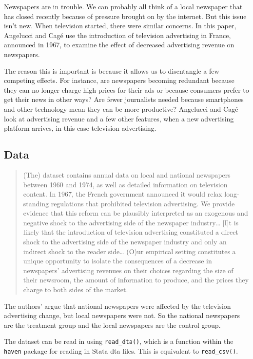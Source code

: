 \documentclass[
]{book}
\begin{document}
Newspapers are in trouble. We can probably all think of a local newspaper that has closed recently because of pressure brought on by the internet. But this issue isn't new. When television started, there were similar concerns. In this paper, Angelucci and Cagé use the introduction of television advertising in France, announced in 1967, to examine the effect of decreased advertising revenue on newspapers.

The reason this is important is because it allows us to disentangle a few competing effects. For instance, are newspapers becoming redundant because they can no longer charge high prices for their ads or because consumers prefer to get their news in other ways? Are fewer journalists needed because smartphones and other technology mean they can be more productive? Angelucci and Cagé look at advertising revenue and a few other features, when a new advertising platform arrives, in this case television advertising.

\hypertarget{data}{%
\subsection{Data}\label{data}}

\begin{quote}
(The) dataset contains annual data on local and national newspapers between 1960 and 1974, as well as detailed information on television content. In 1967, the French government announced it would relax long-standing regulations that prohibited television advertising. We provide evidence that this reform can be plausibly interpreted as an exogenous and negative shock to the advertising side of the newspaper industry\ldots{} {[}I{]}t is likely that the introduction of television advertising constituted a direct shock to the advertising side of the newspaper industry and only an indirect shock to the reader side\ldots{} (O)ur empirical setting constitutes a unique opportunity to isolate the consequences of a decrease in newspapers' advertising revenues on their choices regarding the size of their newsroom, the amount of information to produce, and the prices they charge to both sides of the market.
\end{quote}

The authors' argue that national newspapers were affected by the television advertising change, but local newspapers were not. So the national newspapers are the treatment group and the local newspapers are the control group.

The dataset can be read in using \texttt{read\_dta()}, which is a function within the \texttt{haven} package for reading in Stata dta files. This is equivalent to \texttt{read\_csv()}.
\end{document}
